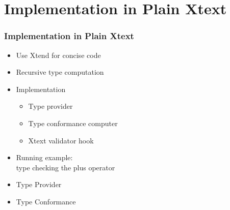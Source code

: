 \section[Plain Xtext]{Implementation in Plain Xtext}

\begin{frame}
  \tableofcontents[currentsection]
\end{frame}

\begin{frame}
  \frametitle{Implementation in Plain Xtext}
  \begin{itemize}
    \item Use Xtend for concise code
    \item Recursive type computation
    \item Implementation
    \begin{itemize}
      \item Type provider
      \item Type conformance computer
      \item Xtext validator hook
    \end{itemize}
  \end{itemize}
  \begin{itemize}
    \item Running example: \\
    type checking the plus operator
  \end{itemize}



\framebreak
\begin{itemize}
  \item Type Provider 
\end{itemize}

\begin{footnotesize}

\end{footnotesize}

\framebreak
\begin{itemize}
  \item Type Conformance 
\end{itemize}

\begin{footnotesize}

\end{footnotesize}

\end{frame}
